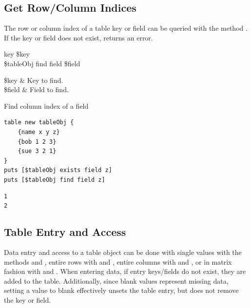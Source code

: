 \subsection{Get Row/Column Indices}
The row or column index of a table key or field can be queried with the method . 
If the key or field does not exist, returns an error.

\begin{syntax}
 key \$key \\
\$tableObj find field \$field
\end{syntax}
\begin{args}
\$key & Key to find. \\
\$field & Field to find.
\end{args}

\begin{example}{Find column index of a field}
\begin{lstlisting}
table new tableObj {
    {name x y z}
    {bob 1 2 3}
    {sue 3 2 1}
}
puts [$tableObj exists field z]
puts [$tableObj find field z]
\end{lstlisting}
\tcblower
\begin{lstlisting}
1
2
\end{lstlisting}
\end{example}

\clearpage
\subsection{Table Entry and Access}
Data entry and access to a table object can be done with single values with the methods  and , entire rows with  and , entire columns with  and , or in matrix fashion with  and . 
When entering data, if entry keys/fields do not exist, they are added to the table. 
Additionally, since blank values represent missing data, setting a value to blank effectively unsets the table entry, but does not remove the key or field. 

